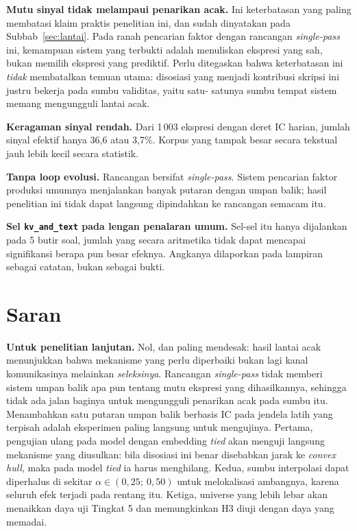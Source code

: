 \documentclass{laporanta1statugm}
\newcommand{\code}[1]{\texttt{#1}}
\begin{document}
\textbf{Mutu sinyal tidak melampaui penarikan acak.} Ini keterbatasan yang
paling membatasi klaim praktis penelitian ini, dan sudah dinyatakan pada
Subbab~\ref{sec:lantai}. Pada ranah pencarian faktor dengan rancangan
\textit{single-pass} ini, kemampuan sistem yang terbukti adalah menuliskan
ekspresi yang sah, bukan memilih ekspresi yang prediktif. Perlu ditegaskan
bahwa keterbatasan ini \emph{tidak} membatalkan temuan utama: disosiasi yang
menjadi kontribusi skripsi ini justru bekerja pada sumbu validitas, yaitu satu-
satunya sumbu tempat sistem memang mengungguli lantai acak.

\textbf{Keragaman sinyal rendah.} Dari 1\,003 ekspresi dengan deret IC harian,
jumlah sinyal efektif hanya 36,6 atau 3,7\%. Korpus yang tampak besar secara
tekstual jauh lebih kecil secara statistik.

\textbf{Tanpa loop evolusi.} Rancangan bersifat \textit{single-pass}. Sistem
pencarian faktor produksi umumnya menjalankan banyak putaran dengan umpan
balik; hasil penelitian ini tidak dapat langsung dipindahkan ke rancangan
semacam itu.

\textbf{Sel \code{kv\_and\_text} pada lengan penalaran umum.} Sel-sel itu hanya
dijalankan pada 5 butir soal, jumlah yang secara aritmetika tidak dapat
mencapai signifikansi berapa pun besar efeknya. Angkanya dilaporkan pada
lampiran sebagai catatan, bukan sebagai bukti.

\section{Saran}

\textbf{Untuk penelitian lanjutan.} Nol, dan paling mendesak: hasil lantai
acak menunjukkan bahwa mekanisme yang perlu diperbaiki bukan lagi kanal
komunikasinya melainkan \emph{seleksinya}. Rancangan \textit{single-pass} tidak
memberi sistem umpan balik apa pun tentang mutu ekspresi yang dihasilkannya,
sehingga tidak ada jalan baginya untuk mengungguli penarikan acak pada sumbu
itu. Menambahkan satu putaran umpan balik berbasis IC pada jendela latih yang
terpisah adalah eksperimen paling langsung untuk mengujinya. Pertama, pengujian ulang pada model dengan
embedding \textit{tied} akan menguji langsung mekanisme yang diusulkan: bila
disosiasi ini benar disebabkan jarak ke \textit{convex hull}, maka pada model
\textit{tied} ia harus menghilang. Kedua, sumbu interpolasi dapat diperhalus di
sekitar $\alpha\in(0{,}25;\ 0{,}50)$ untuk melokalisasi ambangnya, karena
seluruh efek terjadi pada rentang itu. Ketiga, universe yang lebih lebar akan
menaikkan daya uji Tingkat 5 dan memungkinkan H3 diuji dengan daya yang
memadai.
\end{document}
